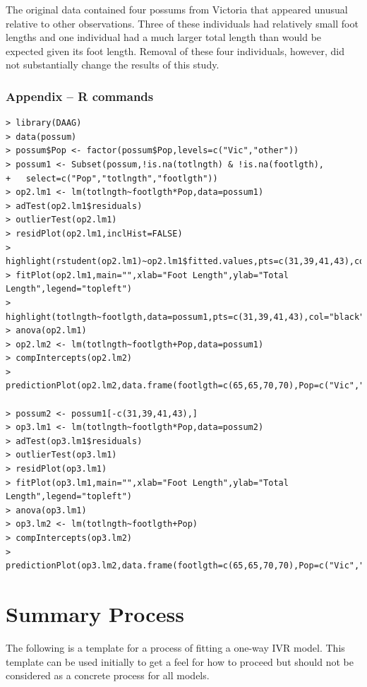 \documentclass[10pt,openany]{book}\usepackage[]{graphicx}\usepackage[]{color}
\begin{document}
The original data contained four possums from Victoria that appeared unusual relative to other observations.  Three of these individuals had relatively small foot lengths and one individual had a much larger total length than would be expected given its foot length.  Removal of these four individuals, however, did not substantially change the results of this study.

\subsubsection*{Appendix -- R commands}
\begin{Verbatim}[formatcom=\color{red},xleftmargin=5mm,commandchars=\\\{\}]
> library(DAAG)
> data(possum)
> possum$Pop <- factor(possum$Pop,levels=c("Vic","other"))
> possum1 <- Subset(possum,!is.na(totlngth) & !is.na(footlgth),
+   select=c("Pop","totlngth","footlgth"))
> op2.lm1 <- lm(totlngth~footlgth*Pop,data=possum1)
> adTest(op2.lm1$residuals)
> outlierTest(op2.lm1)
> residPlot(op2.lm1,inclHist=FALSE)
> highlight(rstudent(op2.lm1)~op2.lm1$fitted.values,pts=c(31,39,41,43),col="black")
> fitPlot(op2.lm1,main="",xlab="Foot Length",ylab="Total Length",legend="topleft")
> highlight(totlngth~footlgth,data=possum1,pts=c(31,39,41,43),col="black")
> anova(op2.lm1)
> op2.lm2 <- lm(totlngth~footlgth+Pop,data=possum1)
> compIntercepts(op2.lm2)
> predictionPlot(op2.lm2,data.frame(footlgth=c(65,65,70,70),Pop=c("Vic","other","Vic","other")))

> possum2 <- possum1[-c(31,39,41,43),]
> op3.lm1 <- lm(totlngth~footlgth*Pop,data=possum2)
> adTest(op3.lm1$residuals)
> outlierTest(op3.lm1)
> residPlot(op3.lm1)
> fitPlot(op3.lm1,main="",xlab="Foot Length",ylab="Total Length",legend="topleft")
> anova(op3.lm1)
> op3.lm2 <- lm(totlngth~footlgth+Pop)
> compIntercepts(op3.lm2)
> predictionPlot(op3.lm2,data.frame(footlgth=c(65,65,70,70),Pop=c("Vic","other","Vic","other")))
\end{Verbatim}



\newpage
\section{Summary Process}
The following is a template for a process of fitting a one-way IVR model.  This template can be used initially to get a feel for how to proceed but should not be considered as a concrete process for all models.
\end{document}
